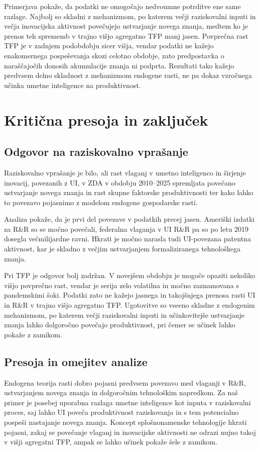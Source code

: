 \documentclass[12pt,a4paper]{article}
\begin{document}
Primerjava pokaže, da podatki ne omogočajo nedvoumne potrditve ene same razlage. Najbolj so skladni z mehanizmom, po katerem večji raziskovalni inputi in večja inovacijska aktivnost povečujejo ustvarjanje novega znanja, medtem ko je prenos teh sprememb v trajno višjo agregatno TFP manj jasen. Povprečna rast TFP je v zadnjem podobdobju sicer višja, vendar podatki ne kažejo enakomernega pospeševanja skozi celotno obdobje, zato predpostavka o naraščajočih donosih akumulacije znanja ni podprta. Rezultati tako kažejo predvsem delno skladnost z mehanizmom endogene rasti, ne pa dokaz vzročnega učinka umetne inteligence na produktivnost.

\section{Kritična presoja in zaključek}\label{sec:zakljucek}

\subsection{Odgovor na raziskovalno vprašanje}

Raziskovalno vprašanje je bilo, ali rast vlaganj v umetno inteligenco in širjenje inovacij, povezanih z UI, v ZDA v obdobju 2010--2025 spremljata povečano ustvarjanje novega znanja in rast skupne faktorske produktivnosti ter kako lahko to povezavo pojasnimo z modelom endogene gospodarske rasti.

Analiza pokaže, da je prvi del povezave v podatkih precej jasen. Ameriški izdatki za R\&R so se močno povečali, federalna vlaganja v UI R\&R pa so po letu 2019 dosegla večmilijardne ravni. Hkrati je močno narasla tudi UI-povezana patentna aktivnost, kar je skladno z večjim ustvarjanjem formaliziranega tehnološkega znanja.

Pri TFP je odgovor bolj zadržan. V novejšem obdobju je mogoče opaziti nekoliko višjo povprečno rast, vendar je serija zelo volatilna in močno zaznamovana s pandemskimi šoki. Podatki zato ne kažejo jasnega in takojšnjega prenosa rasti UI in R\&R v trajno višjo agregatno TFP. Ugotovitve so vseeno skladne z endogenim mehanizmom, po katerem večji raziskovalni inputi in učinkovitejše ustvarjanje znanja lahko dolgoročno povečajo produktivnost, pri čemer se učinek lahko pokaže z zamikom.

\subsection{Presoja in omejitev analize}
Endogena teorija rasti dobro pojasni predvsem povezavo med vlaganji v R\&R, ustvarjanjem novega znanja in dolgoročnim tehnološkim napredkom. Za naš primer je posebej uporabna razlaga umetne inteligence kot inputa v raziskovalni proces, saj lahko UI poveča produktivnost raziskovanja in s tem potencialno pospeši nastajanje novega znanja. Koncept splošnonamenske tehnologije hkrati pojasni, zakaj se povečanje vlaganj in inovacijske aktivnosti ne odrazi nujno takoj v višji agregatni TFP, ampak se lahko učinek pokaže šele z zamikom.
\end{document}
